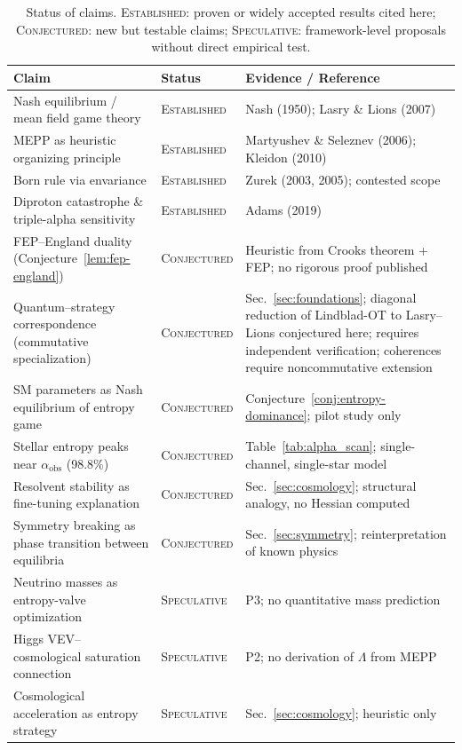 \documentclass[12pt,a4paper]{article}
\theoremstyle{remark}
\begin{document}
\begin{table}[htbp]
\centering
\caption{Status of claims. \textsc{Established}: proven or widely accepted results cited here; \textsc{Conjectured}: new but testable claims; \textsc{Speculative}: framework-level proposals without direct empirical test.}
\label{tab:status-claims}
\small
\begin{tabular}{p{4.8cm}lp{5.2cm}}
\toprule
\textbf{Claim} & \textbf{Status} & \textbf{Evidence / Reference} \\
\midrule
Nash equilibrium / mean field game theory & \textsc{Established} & Nash (1950); Lasry \& Lions (2007) \\
MEPP as heuristic organizing principle & \textsc{Established} & Martyushev \& Seleznev (2006); Kleidon (2010) \\
Born rule via envariance & \textsc{Established} & Zurek (2003, 2005); contested scope \\
Diproton catastrophe \& triple-alpha sensitivity & \textsc{Established} & Adams (2019) \\
FEP--England duality (Conjecture~\ref{lem:fep-england}) & \textsc{Conjectured} & Heuristic from Crooks theorem + FEP; no rigorous proof published \\
Quantum--strategy correspondence (commutative specialization) & \textsc{Conjectured} & Sec.~\ref{sec:foundations}; diagonal reduction of Lindblad-OT to Lasry--Lions conjectured here; requires independent verification; coherences require noncommutative extension \\
SM parameters as Nash equilibrium of entropy game & \textsc{Conjectured} & Conjecture~\ref{conj:entropy-dominance}; pilot study only \\
Stellar entropy peaks near $\alpha_{\text{obs}}$ (98.8\%) & \textsc{Conjectured} & Table~\ref{tab:alpha_scan}; single-channel, single-star model \\
Resolvent stability as fine-tuning explanation & \textsc{Conjectured} & Sec.~\ref{sec:cosmology}; structural analogy, no Hessian computed \\
Symmetry breaking as phase transition between equilibria & \textsc{Conjectured} & Sec.~\ref{sec:symmetry}; reinterpretation of known physics \\
Neutrino masses as entropy-valve optimization & \textsc{Speculative} & P3; no quantitative mass prediction \\
Higgs VEV--cosmological saturation connection & \textsc{Speculative} & P2; no derivation of $\Lambda$ from MEPP \\
Cosmological acceleration as entropy strategy & \textsc{Speculative} & Sec.~\ref{sec:cosmology}; heuristic only \\
\bottomrule
\end{tabular}
\end{table}
\end{document}
